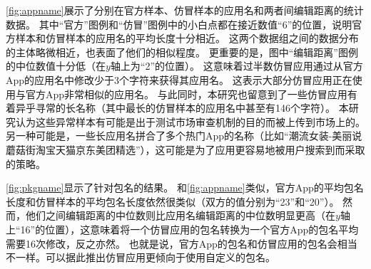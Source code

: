 \autoref{fig:appname}展示了分别在官方样本、仿冒样本的应用名和两者间编辑距离的统计数据。
其中``官方''图例和``仿冒''图例中的小白点都在接近数值``6''的位置，说明官方样本和仿冒样本的应用名的平均长度十分相近。
这两个数据组之间的数据分布的主体略微相近，也表面了他们的相似程度。
更重要的是，图中``编辑距离''图例的中位数值十分低（在$y$轴上为``2''的位置）。
这意味着过半数仿冒应用通过从官方App的应用名中修改少于3个字符来获得其应用名。
这表示大部分仿冒应用正在使用与官方App非常相似的应用名。
与此同时，本研究也留意到了一些仿冒应用有着异乎寻常的长名称（其中最长的仿冒样本的应用名中甚至有146个字符）。
本研究认为这些异常样本有可能是出于测试市场审查机制的目的而被上传到市场上的。
另一种可能是，一些长应用名拼合了多个热门App的名称（比如``潮流女装-美丽说蘑菇街淘宝天猫京东美团精选''），这可能是为了应用更容易地被用户搜索到而采取的策略。

\autoref{fig:pkgname}显示了针对包名的结果。
和\autoref{fig:appname}类似，官方App的平均包名长度和仿冒样本的平均包名长度依然很类似（双方的值分别为``23''和``20''）。
然而，他们之间编辑距离的中位数则比应用名编辑距离的中位数明显更高（在$y$轴上``16''的位置），这意味着将一个仿冒应用的包名转换为一个官方App的包名平均需要16次修改，反之亦然。
也就是说，官方App的包名和仿冒应用的包名会相当不一样。可以据此推出仿冒应用更倾向于使用自定义的包名。

